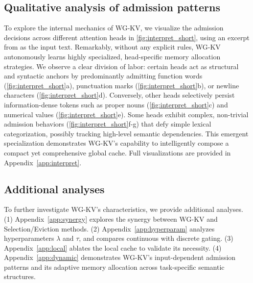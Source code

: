 \subsection{Qualitative analysis of admission patterns}

To explore the internal mechanics of WG-KV, we visualize the admission decisions across different attention heads in \cref{fig:interpret_short}, using an excerpt from \citet{medtner} as the input text. Remarkably, without any explicit rules, WG-KV autonomously learns highly specialized, head-specific memory allocation strategies. We observe a clear division of labor: certain heads act as structural and syntactic anchors by predominantly admitting function words (\cref{fig:interpret_short}a), punctuation marks (\cref{fig:interpret_short}b), or newline characters (\cref{fig:interpret_short}d). Conversely, other heads selectively persist information-dense tokens such as proper nouns (\cref{fig:interpret_short}c) and numerical values (\cref{fig:interpret_short}e). Some heads exhibit complex, non-trivial admission behaviors (\cref{fig:interpret_short}f-g) that defy simple lexical categorization, possibly tracking high-level semantic dependencies. This emergent specialization demonstrates WG-KV's capability to intelligently compose a compact yet comprehensive global cache. Full visualizations are provided in Appendix~\ref{app:interpret}.

\subsection{Additional analyses}

To further investigate WG-KV's characteristics, we provide additional analyses. (1) Appendix~\ref{app:synergy} explores the synergy between WG-KV and Selection/Eviction methods. (2) Appendix~\ref{app:hyperparam} analyzes hyperparameters $\lambda$ and $\tau$, and compares continuous with discrete gating. (3) Appendix~\ref{app:local} ablates the local cache to validate its necessity. (4) Appendix~\ref{app:dynamic} demonstrates WG-KV's input-dependent admission patterns and its adaptive memory allocation across task-specific semantic structures.

